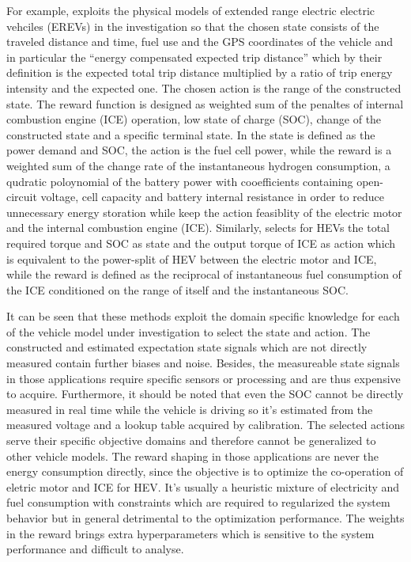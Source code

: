 \documentclass{article}
\begin{document}
For example, \parencite{Wang_2020} exploits the physical models of extended range electric electric vehciles (EREVs) in the investigation so that the chosen state consists of the traveled distance and time, fuel use and the GPS coordinates of the vehicle and in particular the ``energy compensated expected trip distance'' which by their definition is the expected total trip distance multiplied by a ratio of trip energy intensity and the expected one. The chosen action is the range of the constructed state. The reward function is designed as weighted sum of the penaltes of internal combustion engine (ICE) operation, low state of charge (SOC), change of the constructed state and a specific terminal state. In \parencite{Hou_2022} the state is defined as the power demand and SOC, the action is the fuel cell power, while the reward is a weighted sum of the change rate of the instantaneous hydrogen consumption, a qudratic poloynomial of the battery power with cooefficients containing open-circuit voltage, cell capacity and battery internal resistance in order to reduce unnecessary energy storation while keep the action feasiblity of the electric motor and the internal combustion engine (ICE). Similarly, \parencite{Hu_2018} selects for HEVs the total required torque and SOC as state and the output torque of ICE as action which is equivalent to the power-split of HEV between the electric motor and ICE, while the reward is defined as the reciprocal of instantaneous fuel consumption of the ICE conditioned on the range of itself and the instantaneous SOC\@.

It can be seen that these methods exploit the domain specific knowledge for each of the vehicle model under investigation to select the state and action. The constructed and estimated expectation state signals which are not directly measured contain further biases and noise. Besides, the measureable state signals in those applications require specific sensors or processing and are thus expensive to acquire. Furthermore, it should be noted that even the SOC cannot be directly measured in real time while the vehicle is driving so it's estimated from the measured voltage and a lookup table acquired by calibration. The selected actions serve their specific objective domains and therefore cannot be generalized to other vehicle models. The reward shaping in those applications are never the energy consumption directly, since the objective is to optimize the co-operation of eletric motor and ICE for HEV\@. It's usually a heuristic mixture of electricity and fuel consumption with constraints which are required to regularized the system behavior but in general detrimental to the optimization performance. The weights in the reward brings extra hyperparameters which is sensitive to the system performance and difficult to analyse.
\end{document}
